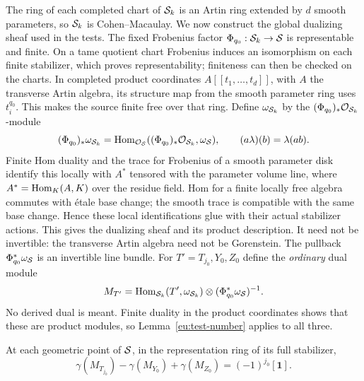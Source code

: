 The ring of each completed chart of $\mathcal S_k$ is an Artin ring extended
by $d$ smooth parameters, so $\mathcal S_k$ is Cohen--Macaulay.  We now
construct the global dualizing sheaf used in the tests.
The fixed Frobenius factor $\Phi_{q_0}:\mathcal S_k\to\mathcal S$ is representable
and finite. On a tame quotient chart Frobenius induces an isomorphism
on each finite stabilizer, which proves representability; finiteness
can then be checked on the charts. In completed product coordinates
$A[[t_1,\ldots,t_d]]$, with $A$ the transverse Artin algebra, its
structure map from the smooth parameter ring uses $t_i^{q_0}$.
This makes the source finite free over that ring. Define
$\omega_{\mathcal S_k}$ by the $(\Phi_{q_0})_*\mathcal O_{\mathcal S_k}$-module
\[
 (\Phi_{q_0})_*\omega_{\mathcal S_k}
   =\operatorname{Hom}_{\mathcal O_{\mathcal S}}
          ((\Phi_{q_0})_*\mathcal O_{\mathcal S_k},\omega_{\mathcal S}),
 \qquad (a\lambda)(b)=\lambda(ab).
\]
Finite Hom duality and the trace for Frobenius of a smooth parameter
disk identify this locally with $A^*$ tensored with the parameter
volume line, where $A^*=\operatorname{Hom}_K(A,K)$ over the residue field.
Hom for a finite locally free algebra commutes with \'etale base change;
the smooth trace is compatible with the same base change. Hence these
local identifications glue with their actual stabilizer actions.
This gives the dualizing sheaf and its product description.  It need
not be invertible: the transverse Artin algebra need not be Gorenstein.
The pullback $\Phi_{q_0}^*\omega_{\mathcal S}$ is an invertible line bundle.
For $T'=T_{j_0},Y_0,Z_0$ define the
\emph{ordinary} dual module
\begin{equation}\label{eu:dual-test}
 M_{T'}=\operatorname{Hom}_{\mathcal S_k}(T',\omega_{\mathcal S_k})
                       \otimes(\Phi_{q_0}^*\omega_{\mathcal S})^{-1}.
\end{equation}
No derived dual is meant.  Finite duality in the product coordinates
shows that these are product modules, so
Lemma~\ref{eu:test-number} applies to all three.

\begin{lemma}\label{eu:character-extraction}
At each geometric point of $\mathcal S$, in the representation ring of its
full stabilizer,
\begin{equation}\label{eu:trivial-fiber}
 \gamma(M_{T_{j_0}})-\gamma(M_{Y_0})+\gamma(M_{Z_0})
                    =(-1)^{j_0}[\mathbf1].
\end{equation}
\end{lemma}

